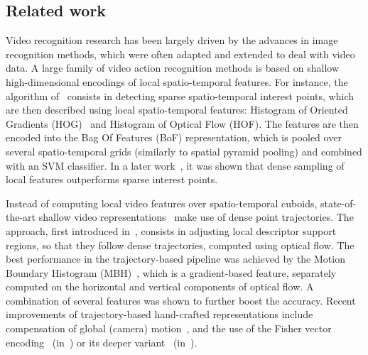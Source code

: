 \documentclass{article} %
\begin{document}
\subsection{Related work}
\label{sec:related_work}
Video recognition research has been largely driven by the advances in image recognition methods, which were often adapted and extended to deal with video data.
A large family of video action recognition methods is based on shallow high-dimensional encodings of local spatio-temporal features. 
For instance, the algorithm of~\cite{Laptev08} consists in detecting sparse spatio-temporal interest points,
which are then described using local spatio-temporal features: Histogram of Oriented Gradients (HOG)~\cite{Dalal05} and Histogram of Optical Flow (HOF). The features
are then encoded into the Bag Of Features (BoF) representation, which is pooled over several spatio-temporal grids (similarly to spatial pyramid pooling)
and combined with an SVM classifier. In a later work~\cite{Wang09}, it was shown that dense sampling of local features outperforms sparse interest points.

Instead of computing local video features over spatio-temporal cuboids, state-of-the-art shallow video representations~\cite{Wang13b,Peng14,Peng14a} make use of dense point trajectories.
The approach, first introduced in~\cite{Wang11b}, consists in adjusting local descriptor support regions, so that they follow dense trajectories, computed using optical flow.
The best performance in the trajectory-based pipeline was achieved by the Motion Boundary Histogram (MBH)~\cite{Dalal06}, which is a
gradient-based feature, separately computed on the horizontal and vertical components of optical flow. A combination of several features was shown to further boost the accuracy.
Recent improvements of trajectory-based hand-crafted representations include compensation of global (camera) motion~\cite{Jain13,Kuehne11,Wang13b}, and the use of the Fisher vector 
encoding~\cite{Perronnin10a} (in~\cite{Wang13b}) or its deeper variant~\cite{Simonyan13b} (in~\cite{Peng14a}).
\end{document}
